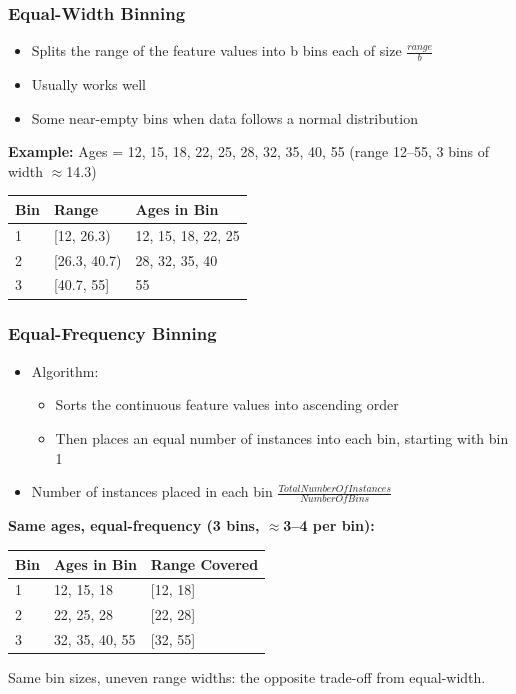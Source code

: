\begin{frame}[fragile]\frametitle{Equal-Width Binning}
\begin{itemize}
\item Splits the range of the feature values into b bins each of size $\frac{range}{b}$
\item Usually works well
\item Some near-empty bins when data follows a normal distribution
\end{itemize}
\textbf{Example:} Ages = 12, 15, 18, 22, 25, 28, 32, 35, 40, 55 \quad (range 12--55, 3 bins of
width $\approx$14.3)
\begin{center}
\begin{tabular}{lll}
\toprule
Bin & Range & Ages in Bin \\
\midrule
1 & [12, 26.3) & 12, 15, 18, 22, 25 \\
2 & [26.3, 40.7) & 28, 32, 35, 40 \\
3 & [40.7, 55] & 55 \\
\bottomrule
\end{tabular}
\end{center}
\end{frame}




\begin{frame}[fragile]\frametitle{Equal-Frequency Binning}
\begin{itemize}
\item Algorithm:
	\begin{itemize}
	\item Sorts the continuous feature values into ascending order
	\item Then places an equal number of instances into each bin, starting with bin 1
	\end{itemize}
\item Number of instances placed in each bin $\frac{TotalNumberOfInstances}{NumberOfBins}$
\end{itemize}
\textbf{Same ages, equal-frequency (3 bins, $\approx$3--4 per bin):}
\begin{center}
\begin{tabular}{lll}
\toprule
Bin & Ages in Bin & Range Covered \\
\midrule
1 & 12, 15, 18 & [12, 18] \\
2 & 22, 25, 28 & [22, 28] \\
3 & 32, 35, 40, 55 & [32, 55] \\
\bottomrule
\end{tabular}
\end{center}
Same bin sizes, uneven range widths: the opposite trade-off from equal-width.
\end{frame}


